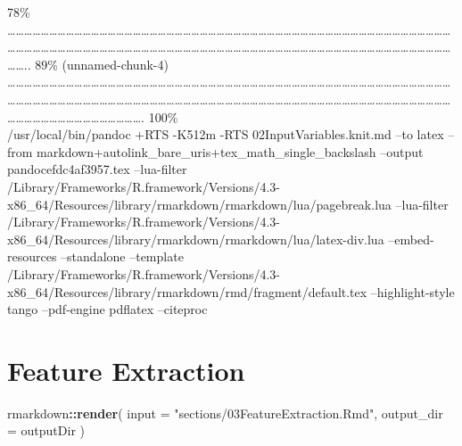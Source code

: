 \documentclass[
]{article}
\newenvironment{Shaded}{\begin{snugshade}}{\end{snugshade}}
\newcommand{\AttributeTok}[1]{\textcolor[rgb]{0.13,0.29,0.53}{#1}}
\newcommand{\FunctionTok}[1]{\textcolor[rgb]{0.13,0.29,0.53}{\textbf{#1}}}
\newcommand{\NormalTok}[1]{#1}
\newcommand{\SpecialCharTok}[1]{\textcolor[rgb]{0.81,0.36,0.00}{\textbf{#1}}}
\newcommand{\StringTok}[1]{\textcolor[rgb]{0.31,0.60,0.02}{#1}}
\begin{document}
\textbar{} 78\% \textbar{}
\textbar\ldots\ldots\ldots\ldots\ldots\ldots\ldots\ldots\ldots\ldots\ldots\ldots\ldots\ldots\ldots\ldots\ldots\ldots\ldots\ldots\ldots\ldots\ldots\ldots\ldots\ldots\ldots\ldots\ldots\ldots\ldots\ldots\ldots\ldots\ldots\ldots\ldots\ldots\ldots\ldots\ldots\ldots\ldots\ldots\ldots\ldots\ldots\ldots\ldots\ldots\ldots\ldots\ldots\ldots\ldots\ldots\ldots\ldots\ldots\ldots\ldots\ldots\ldots\ldots\ldots\ldots\ldots\ldots\ldots\ldots\ldots\ldots\ldots\ldots\ldots\ldots\ldots\ldots\ldots\ldots\ldots\ldots\ldots\ldots\ldots\ldots\ldots\ldots\ldots\ldots\ldots\ldots\ldots\ldots\ldots\ldots\ldots\ldots\ldots\ldots\ldots\ldots\ldots\ldots\ldots\ldots\ldots\ldots..
\textbar{} 89\% (unnamed-chunk-4) \textbar{}
\textbar\ldots\ldots\ldots\ldots\ldots\ldots\ldots\ldots\ldots\ldots\ldots\ldots\ldots\ldots\ldots\ldots\ldots\ldots\ldots\ldots\ldots\ldots\ldots\ldots\ldots\ldots\ldots\ldots\ldots\ldots\ldots\ldots\ldots\ldots\ldots\ldots\ldots\ldots\ldots\ldots\ldots\ldots\ldots\ldots\ldots\ldots\ldots\ldots\ldots\ldots\ldots\ldots\ldots\ldots\ldots\ldots\ldots\ldots\ldots\ldots\ldots\ldots\ldots\ldots\ldots\ldots\ldots\ldots\ldots\ldots\ldots\ldots\ldots\ldots\ldots\ldots\ldots\ldots\ldots\ldots\ldots\ldots\ldots\ldots\ldots\ldots\ldots\ldots\ldots\ldots\ldots\ldots\ldots\ldots\ldots\ldots\ldots\ldots\ldots\ldots\ldots\ldots\ldots\ldots\ldots\ldots\ldots\ldots\ldots\ldots\ldots\ldots\ldots\ldots\ldots\ldots\ldots\ldots\ldots\ldots\ldots\ldots.\textbar{}
100\%\\
/usr/local/bin/pandoc +RTS -K512m -RTS 02InputVariables.knit.md --to
latex --from markdown+autolink\_bare\_uris+tex\_math\_single\_backslash
--output pandocefdc4af3957.tex --lua-filter
/Library/Frameworks/R.framework/Versions/4.3-x86\_64/Resources/library/rmarkdown/rmarkdown/lua/pagebreak.lua
--lua-filter
/Library/Frameworks/R.framework/Versions/4.3-x86\_64/Resources/library/rmarkdown/rmarkdown/lua/latex-div.lua
--embed-resources --standalone --template
/Library/Frameworks/R.framework/Versions/4.3-x86\_64/Resources/library/rmarkdown/rmd/fragment/default.tex
--highlight-style tango --pdf-engine pdflatex --citeproc

\hypertarget{feature-extraction}{%
\section{Feature Extraction}\label{feature-extraction}}

\begin{Shaded}
\begin{Highlighting}[]
\NormalTok{rmarkdown}\SpecialCharTok{::}\FunctionTok{render}\NormalTok{(}
  \AttributeTok{input =} \StringTok{"sections/03FeatureExtraction.Rmd"}\NormalTok{,}
  \AttributeTok{output\_dir =}\NormalTok{ outputDir}
\NormalTok{)}
\end{Highlighting}
\end{Shaded}
\end{document}
